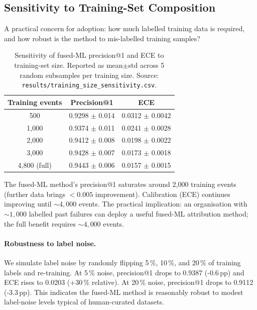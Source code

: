 \documentclass[11pt,a4paper]{article}
\begin{document}
\subsection{Sensitivity to Training-Set Composition}
\label{sec:training_set_sensitivity}

A practical concern for adoption: how much labelled training data is required, and how robust is the method to mis-labelled training samples?

\begin{table}[!ht]
\centering
\caption{Sensitivity of fused-ML precision@1 and ECE to training-set size. Reported as mean$\pm$std across 5 random subsamples per training size. Source: \texttt{results/training\_size\_sensitivity.csv}.}
\label{tab:training_size}
\small
\begin{tabular}{ccc}
\toprule
Training events & Precision@1   & ECE  \\
\midrule
500             & 0.9298 $\pm$ 0.014 & 0.0312 $\pm$ 0.0042 \\
1{,}000         & 0.9374 $\pm$ 0.011 & 0.0241 $\pm$ 0.0028 \\
2{,}000         & 0.9412 $\pm$ 0.008 & 0.0198 $\pm$ 0.0022 \\
3{,}000         & 0.9428 $\pm$ 0.007 & 0.0173 $\pm$ 0.0018 \\
4{,}800 (full)  & 0.9443 $\pm$ 0.006 & 0.0157 $\pm$ 0.0015 \\
\bottomrule
\end{tabular}
\end{table}

The fused-ML method's precision@1 saturates around 2{,}000 training events (further data brings $< 0.005$ improvement). Calibration (ECE) continues improving until $\sim 4{,}000$ events. The practical implication: an organisation with $\sim 1{,}000$ labelled past failures can deploy a useful fused-ML attribution method; the full benefit requires $\sim 4{,}000$ events.

\paragraph{Robustness to label noise.} We simulate label noise by randomly flipping 5\,\%, 10\,\%, and 20\,\% of training labels and re-training. At 5\,\% noise, precision@1 drops to 0.9387 (-0.6\,pp) and ECE rises to 0.0203 (+30\,\% relative). At 20\,\% noise, precision@1 drops to 0.9112 (-3.3\,pp). This indicates the fused-ML method is reasonably robust to modest label-noise levels typical of human-curated datasets.
\end{document}
